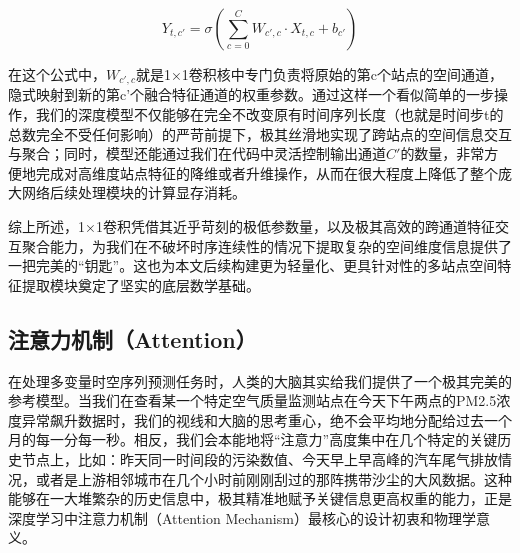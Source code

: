 \begin{equation}\label{eq:Conv1x1}
    Y_{t,c'} = \sigma(\sum_{c=0}^{C} W_{c',c} \cdot X_{t,c} + b_{c'})
\end{equation}

在这个公式中，$W_{c',c}$就是1×1卷积核中专门负责将原始的第c个站点的空间通道，隐式映射到新的第c'个融合特征通道的权重参数。通过这样一个看似简单的一步操作，我们的深度模型不仅能够在完全不改变原有时间序列长度（也就是时间步t的总数完全不受任何影响）的严苛前提下，极其丝滑地实现了跨站点的空间信息交互与聚合；同时，模型还能通过我们在代码中灵活控制输出通道$C'$的数量，非常方便地完成对高维度站点特征的降维或者升维操作，从而在很大程度上降低了整个庞大网络后续处理模块的计算显存消耗。

综上所述，1×1卷积凭借其近乎苛刻的极低参数量，以及极其高效的跨通道特征交互聚合能力，为我们在不破坏时序连续性的情况下提取复杂的空间维度信息提供了一把完美的“钥匙”。这也为本文后续构建更为轻量化、更具针对性的多站点空间特征提取模块奠定了坚实的底层数学基础。

\subsection{注意力机制（Attention）}\label{subsec:attention}

在处理多变量时空序列预测任务时，人类的大脑其实给我们提供了一个极其完美的参考模型。当我们在查看某一个特定空气质量监测站点在今天下午两点的PM2.5浓度异常飙升数据时，我们的视线和大脑的思考重心，绝不会平均地分配给过去一个月的每一分每一秒。相反，我们会本能地将“注意力”高度集中在几个特定的关键历史节点上，比如：昨天同一时间段的污染数值、今天早上早高峰的汽车尾气排放情况，或者是上游相邻城市在几个小时前刚刚刮过的那阵携带沙尘的大风数据。这种能够在一大堆繁杂的历史信息中，极其精准地赋予关键信息更高权重的能力，正是深度学习中注意力机制（Attention Mechanism）最核心的设计初衷和物理学意义。

